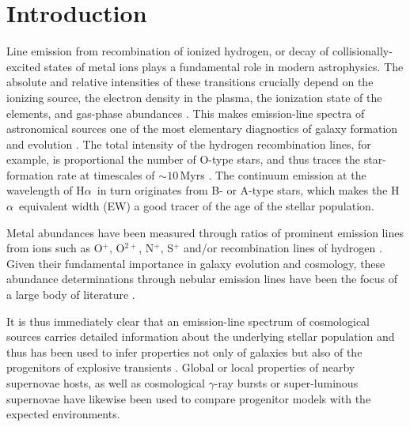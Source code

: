 \documentclass[traditabstract]{aa}
\newcommand{\ha}{H$\alpha$}
\begin{document}
\section{Introduction}
\label{sec:Intro}

Line emission from recombination of ionized hydrogen, or decay of collisionally-excited states of metal ions plays a fundamental role in modern astrophysics. The absolute and relative intensities of these transitions crucially depend on the ionizing source, the electron density in the plasma, the ionization state of the elements, and gas-phase abundances \citep{1989agna.book.....O}. This makes emission-line spectra of astronomical sources one of the most elementary diagnostics of galaxy formation and evolution \citep[e.g.][]{2004ApJ...613..898T, 2006ApJ...644..813E, 2009ApJ...706.1364F}. The total intensity of the hydrogen recombination lines, for example, is proportional the number of O-type stars, and thus traces the star-formation rate at timescales of $\sim 10$\,Myrs \citep[e.g.][]{1998ARA&A..36..189K}. The continuum emission at the wavelength of \ha\, in turn originates from B- or A-type stars, which makes the \ha\, equivalent width (EW) a good tracer of the age of the stellar population.

Metal abundances have been measured through ratios of prominent emission lines from ions such as O$^{+}$, O$^{2+}$, N$^{+}$, S$^{+}$ and/or recombination lines of hydrogen \citep{1979MNRAS.189...95P, 1979A&A....78..200A}. Given their fundamental importance in galaxy evolution and cosmology, these abundance determinations through nebular emission lines have been the focus of a large body of literature \citep[e.g.][]{2004ApJ...617..240K, 2005ApJ...631..231P, 2006A&A...454L.127S, 2006A&A...448..955I, 2008ApJ...681.1183K}.

It is thus immediately clear that an emission-line spectrum of cosmological sources carries detailed information about the underlying stellar population and thus has been used to infer properties not only of galaxies but also of the progenitors of explosive transients \citep[see e.g.][for a review]{2009ARA&A..47...63S}. Global \citep[e.g.][]{2008ApJ...673..999P, 2011MNRAS.412.1441L} or local \citep[e.g.][]{2010MNRAS.407.2660A, 2011ApJ...731L...4M, 2011A&A...530A..95L} properties of nearby supernovae hosts, as well as cosmological $\gamma$-ray bursts \citep[e.g.][]{2007A&A...464..529W, 2012A&A...546A...8K, 2013ApJ...774..119G} or super-luminous supernovae \citep[e.g.][]{2013ApJ...763L..28C, 2014ApJ...787..138L, 2014arXiv1409.8331L, 2016arXiv160408207P} have likewise been used to compare progenitor models with the expected environments. 
\end{document}
